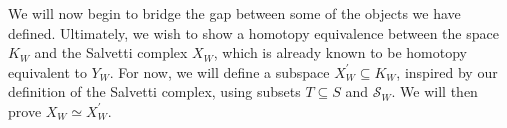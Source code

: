 \documentclass[class=article, crop=false]{standalone}
\begin{document}
We will now begin to bridge the gap between some of the objects we have defined. Ultimately, we wish to show a homotopy equivalence between the space $K_{W}$ and the Salvetti complex $X_W$, which is already known to be homotopy equivalent to $Y_W$. For now, we will define a subspace $X_{W}^\prime \subseteq K_{W}$, inspired by our definition of the Salvetti complex, using subsets $T\subseteq S$ and $\mathcal{S}_W$. We will then prove $X_W \simeq X^\prime_W$.
\end{document}
